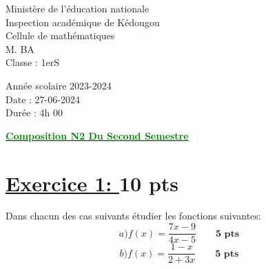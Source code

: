 \documentclass[12pt]{article}
\begin{document}
\begin{minipage}{0.5\textwidth}
	Ministère de l'éducation nationale  \\
	Inspection académique de Kédougou   \\
	Cellule de mathématiques            \\
	M. BA\\
	Classe : 1erS
\end{minipage}
\begin{minipage}{0.5\textwidth}
	Année scolaire 2023-2024 \\
	Date : 27-06-2024 \\
	Durée : 4h 00 \\
\end{minipage}

\begin{center}
	\textbf{{\underline{\textcolor{green}{Composition N2 Du Second Semestre}}}}
\end{center}
\section*{\underline{Exercice 1: }\textbf{10 pts}}
Dans chacun des cas suivants étudier les fonctions suivantes:
\[a)f(x)=\frac{7x-9}{4x-5}\quad\quad\textbf{5 pts}\]
\[b)f(x)=\frac{1-x}{2+3x}\quad\quad\textbf{5 pts}\]
\end{document}

